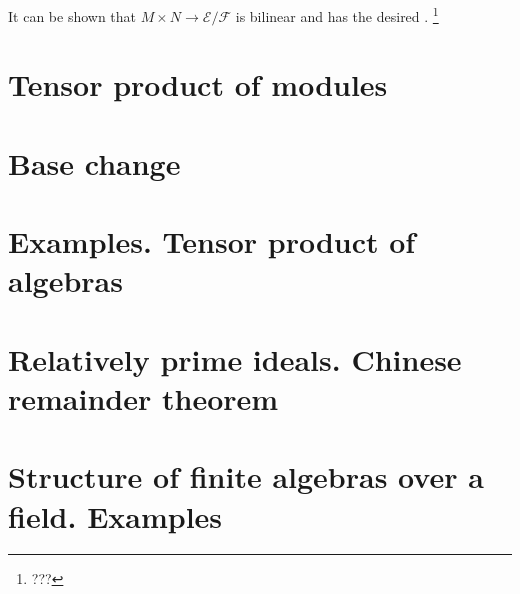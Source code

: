 It can be shown that $M \times N \to \mathcal{E}/\mathcal{F}$ is
bilinear and has the desired .
\footnote{
  ???
}


\section{Tensor product of modules}

\section{Base change}

\section{Examples. Tensor product of algebras}

\section{Relatively prime ideals. Chinese remainder theorem}

\section{Structure of finite algebras over a field. Examples}
